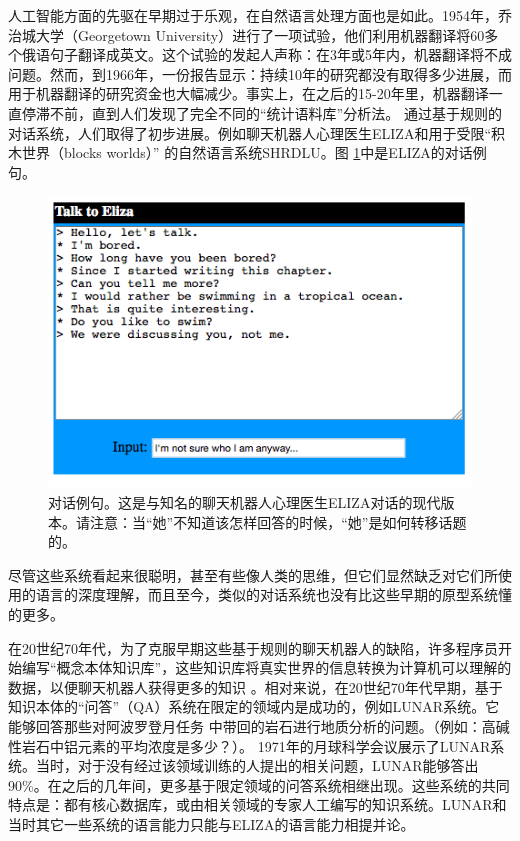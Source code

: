 人工智能方面的先驱在早期过于乐观，在自然语言处理方面也是如此。1954年，乔治城大学（Georgetown University）进行了一项试验，他们利用机器翻译将60多个俄语句子翻译成英文。这个试验的发起人声称：在3年或5年内，机器翻译将不成问题。然而，到1966年，一份报告显示：持续10年的研究都没有取得多少进展，而用于机器翻译的研究资金也大幅减少。事实上，在之后的15-20年里，机器翻译一直停滞不前，直到人们发现了完全不同的“统计语料库”分析法。
通过基于规则的对话系统，人们取得了初步进展。例如聊天机器人心理医生ELIZA\cite{Weizenbaum1966}和用于受限“积木世界（blocks worlds）” 的自然语言系统SHRDLU\cite{Winograd1972}。图 \ref{fig:eliza}中是ELIZA的对话例句。

\begin{figure}[htb]
\centering
\includegraphics[width=14cm]{figures/eliza.png}
\caption{ 对话例句。这是与知名的聊天机器人心理医生ELIZA对话的现代版本。请注意：当“她”不知道该怎样回答的时候，“她”是如何转移话题的。 }
\label{fig:eliza}
\end{figure}

尽管这些系统看起来很聪明，甚至有些像人类的思维，但它们显然缺乏对它们所使用的语言的深度理解，而且至今，类似的对话系统也没有比这些早期的原型系统懂的更多。

在20世纪70年代，为了克服早期这些基于规则的聊天机器人的缺陷，许多程序员开始编写“概念本体知识库”，这些知识库将真实世界的信息转换为计算机可以理解的数据，以便聊天机器人获得更多的知识 \cite{McCorduck2004}。相对来说，在20世纪70年代早期，基于知识本体的“问答”（QA）系统在限定的领域内是成功的，例如LUNAR系统。它能够回答那些对阿波罗登月任务 \cite{Woods1973} 中带回的岩石进行地质分析的问题。（例如：高碱性岩石中铝元素的平均浓度是多少？）。 1971年的月球科学会议展示了LUNAR系统。当时，对于没有经过该领域训练的人提出的相关问题，LUNAR能够答出90\%。在之后的几年间，更多基于限定领域的问答系统相继出现。这些系统的共同特点是：都有核心数据库，或由相关领域的专家人工编写的知识系统。LUNAR和当时其它一些系统的语言能力只能与ELIZA的语言能力相提并论。

